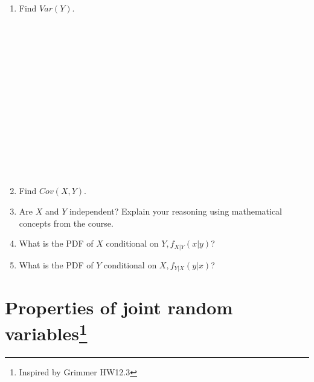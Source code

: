 \documentclass[
]{article}
\begin{document}
\begin{enumerate}
  \strut \\
  \strut \\
  \strut \\
  \strut \\
  \strut \\
  \strut \\
  \strut \\
  \strut \\
  \strut \\
  \strut \\
  \strut \\
  \strut \\
  \strut \\
  \strut \\
\item
  Find \(Var(Y)\).

  \strut \\
  \strut \\
  \strut \\
  \strut \\
  \strut \\
  \strut \\
  \strut \\
  \strut \\
\item
  Find \(Cov(X, Y)\).

  \hfill\break
  \hfill\break
  \hfill\break
  \hfill\break
  \hfill\break
  \hfill\break
  \hfill\break
  \hfill\break
  \hfill\break
  \hfill\break
\item
  Are \(X\) and \(Y\) independent? Explain your reasoning using
  mathematical concepts from the course.

  \hfill\break
  \hfill\break
  \hfill\break
  \hfill\break
  \hfill\break
  \hfill\break
  \hfill\break
  \hfill\break
  \hfill\break
  \hfill\break
\item
  What is the PDF of \(X\) conditional on \(Y, f_{X|Y} (x|y)\)?

  \hfill\break
  \hfill\break
  \hfill\break
  \hfill\break
  \hfill\break
  \hfill\break
  \hfill\break
  \hfill\break
  \hfill\break
  \hfill\break
  \hfill\break
  \hfill\break
  \hfill\break
\item
  What is the PDF of \(Y\) conditional on \(X, f_{Y|X} (y|x)\)?

  \hfill\break
  \hfill\break
  \hfill\break
  \hfill\break
  \hfill\break
  \hfill\break
  \hfill\break
  \hfill\break
\end{enumerate}

\section[Properties of joint random
variables]{\texorpdfstring{Properties of joint random
variables\footnote{Inspired by Grimmer HW12.3}}{Properties of joint random variables}}\label{properties-of-joint-random-variables}
\end{document}
